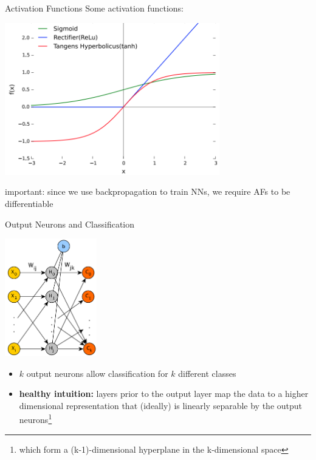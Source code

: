 \documentclass{beamer}
\begin{document}
\begin{frame}{Activation Functions}
Some activation functions:
\begin{center}
\includegraphics[width=0.7\textwidth]{activation_functions}
\end{center}
important: since we use backpropagation to train NNs, we require AFs to be differentiable
\end{frame}

\begin{frame}{Output Neurons and Classification}

\begin{center}
\includegraphics[width=0.3\textwidth]{basic_ff_nn}
\end{center}

\begin{itemize}
\item $k$ output neurons allow classification for $k$ different classes
\item \textbf{healthy intuition:} layers prior to the output layer map the data to a higher dimensional representation that (ideally) is linearly separable by the output neurons\footnote{which form a (k-1)-dimensional hyperplane in the k-dimensional space}
\end{itemize}
\end{frame}
\end{document}
